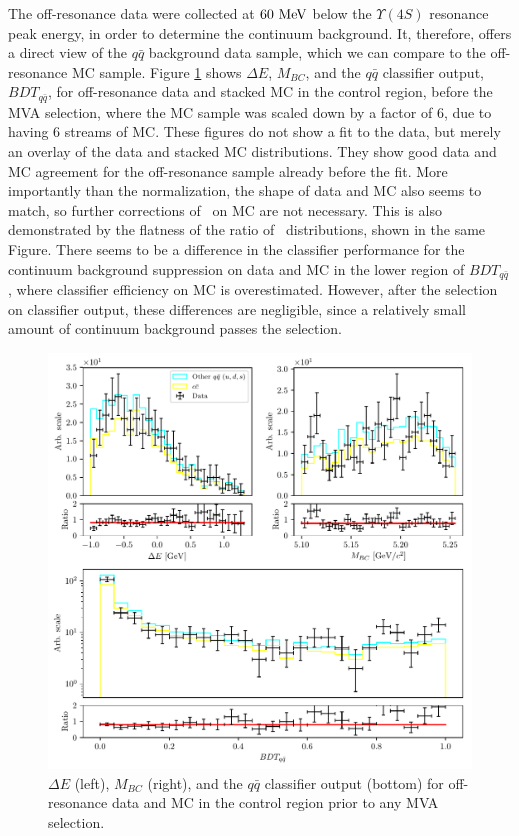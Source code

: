 The off-resonance data were collected at $60\mathrm{~MeV}$ below the $\Upsilon(4S)$ resonance peak energy, in order to determine the continuum background. It, therefore, offers a direct view of the $q\bar q$ background data sample, which we can compare to the off-resonance MC sample. Figure \ref{fig:offres_control} shows $\Delta E$, $M_{BC}$, and the $q \bar q$ classifier output, $BDT_{q\bar q}$, for off-resonance data and stacked MC in the control region, before the MVA selection, where the MC sample was scaled down by a factor of $6$, due to having 6 streams of MC. These figures do not show a fit to the data, but merely an overlay of the data and stacked MC distributions. They show good data and MC agreement for the off-resonance sample already before the fit. More importantly than the normalization, the shape of data and MC also seems to match, so further corrections of \vars~on MC are not necessary. This is also demonstrated by the flatness of the ratio of \vars~distributions, shown in the same Figure. There seems to be a difference in the classifier performance for the continuum background suppression on data and MC in the lower region of $BDT_{q \bar q}$, where classifier efficiency on MC is overestimated. However, after the selection on classifier output, these differences are negligible, since a relatively small amount of continuum background passes the selection.
\begin{figure}[H]
	\centering
	\captionsetup{width=0.8\linewidth}
	\includegraphics[width=\linewidth]{fig/offres_control}
	\caption{$\Delta E$ (left), $M_{BC}$ (right), and the $q \bar q$ classifier output (bottom) for off-resonance data and MC in the control region prior to any MVA selection.}
	\label{fig:offres_control}
\end{figure}

